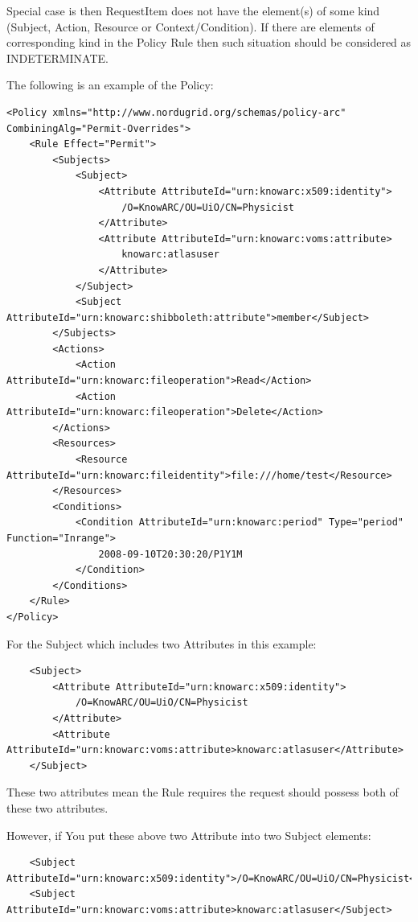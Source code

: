 \documentclass{article}                            %
\begin{document}
Special case is then RequestItem does not have the element(s) of some kind (Subject, Action, Resource or Context/Condition). If there are elements of corresponding kind in the Policy Rule then such situation should be considered as INDETERMINATE.

The following is an example of the Policy:

\begin{verbatim}
<Policy xmlns="http://www.nordugrid.org/schemas/policy-arc" CombiningAlg="Permit-Overrides">
    <Rule Effect="Permit">
        <Subjects>
            <Subject>
                <Attribute AttributeId="urn:knowarc:x509:identity">
                    /O=KnowARC/OU=UiO/CN=Physicist
                </Attribute>
                <Attribute AttributeId="urn:knowarc:voms:attribute>
                    knowarc:atlasuser
                </Attribute>
            </Subject>
            <Subject AttributeId="urn:knowarc:shibboleth:attribute">member</Subject>
        </Subjects>
        <Actions>
            <Action AttributeId="urn:knowarc:fileoperation">Read</Action>
            <Action AttributeId="urn:knowarc:fileoperation">Delete</Action>
        </Actions>
        <Resources>
            <Resource AttributeId="urn:knowarc:fileidentity">file:///home/test</Resource>
        </Resources>
        <Conditions>
            <Condition AttributeId="urn:knowarc:period" Type="period" Function="Inrange">
                2008-09-10T20:30:20/P1Y1M
            </Condition>
        </Conditions>
    </Rule>
</Policy>
\end{verbatim}

For the Subject which includes two Attributes in this example:

\begin{verbatim}
    <Subject>
        <Attribute AttributeId="urn:knowarc:x509:identity">
            /O=KnowARC/OU=UiO/CN=Physicist
        </Attribute>
        <Attribute AttributeId="urn:knowarc:voms:attribute>knowarc:atlasuser</Attribute>
    </Subject>
\end{verbatim}

These two attributes mean the Rule requires the request should possess both of these two attributes.

However, if You put these above two Attribute into two Subject elements:

\begin{verbatim}
    <Subject AttributeId="urn:knowarc:x509:identity">/O=KnowARC/OU=UiO/CN=Physicist</Subject>
    <Subject AttributeId="urn:knowarc:voms:attribute>knowarc:atlasuser</Subject>
\end{verbatim}
\end{document}
